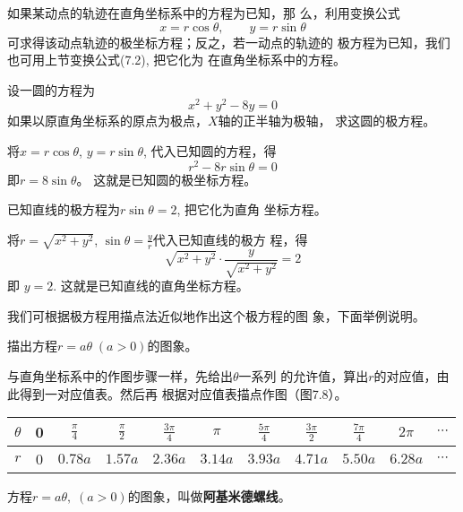 如果某动点的轨迹在直角坐标系中的方程为已知，那
么，利用变换公式
\[x=r\cos\theta,\qquad y=r\sin\theta\]
可求得该动点轨迹的极坐标方程；反之，若一动点的轨迹的
极方程为已知，我们也可用上节变换公式(7.2), 把它化为
在直角坐标系中的方程。

\begin{example}
    设一圆的方程为
\[x^2+y^2-8y=0\]
如果以原直角坐标系的原点为极点，$X$轴的正半轴为极轴，
求这圆的极方程。
\end{example}

\begin{solution}
    将$x=r\cos\theta$, $y=r\sin\theta $, 代入已知圆的方程，得
\[r^2-8r\sin\theta =0\]
即$r=8\sin\theta$。
这就是已知圆的极坐标方程。
\end{solution}

\begin{example}
    已知直线的极方程为$r\sin\theta=2$, 把它化为直角
    坐标方程。
\end{example}

\begin{solution}
    将$r=\sqrt{x^2+y^2}$, $\sin\theta =\frac{y}{r}$代入已知直线的极方
程，得
\[\sqrt{x^2+y^2}\cdot \frac{y}{\sqrt{x^2+y^2}}=2\]
即
$y=2$. 
这就是已知直线的直角坐标方程。
\end{solution}

我们可根据极方程用描点法近似地作出这个极方程的图
象，下面举例说明。

\begin{example}
    描出方程$r=a\theta\; (a>0)$的图象。
\end{example}

\begin{solution}
    与直角坐标系中的作图步骤一样，先给出$\theta$一系列
的允许值，算出$r$的对应值，由此得到一对应值表。然后再
根据对应值表描点作图（图7.8）。
\begin{center}
\begin{tabular}{c|cccccccccc}
\hline
$\theta$ & 0&$\frac{\pi}{4}$&$\frac{\pi}{2}$&$\frac{3\pi}{4}$&$\pi$&$\frac{5\pi}{4}$&$\frac{3\pi}{2}$&$\frac{7\pi}{4}$&$2\pi$&$\cdots$\\
\hline
$r$ & 0&  $0.78a$ & $1.57a$ & $2.36a$ & $3.14a$ & $3.93a$ & $4.71a$ & $5.50a$ & $6.28a$ & $\cdots$\\
\hline
\end{tabular}
\end{center}
\begin{figure}[htp]
    \centering
{}
    \caption{}
\end{figure}

方程$r=a\theta,\; (a>0)$的图象，叫做\textbf{阿基米德螺线}。
\end{solution}

